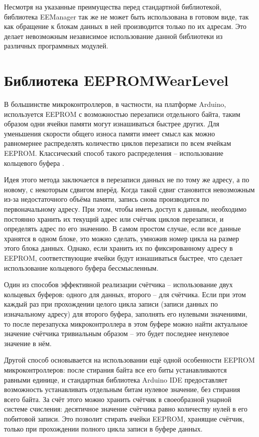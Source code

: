 Несмотря на указанные преимущества перед стандартной библиотекой, библиотека EEManager так же не может быть использована в готовом виде, так как обращение к блокам данных в ней производится только по их адресам.
Это делает невозможным независимое использование данной библиотеки из различных программных модулей.


\section{Библиотека EEPROMWearLevel}

В большинстве микроконтроллеров, в частности, на платформе Arduino, используется EEPROM с возможностью перезаписи отдельного байта, таким образом одни ячейки памяти могут изнашиваться быстрее других.
Для уменьшения скорости общего износа памяти имеет смысл как можно равномернее распределять количество циклов перезаписи по всем ячейкам EEPROM.
Классический способ такого распределения -- использование кольцевого буфера \cite{web:circular-buffer}.

Идея этого метода заключается в перезаписи данных не по тому же адресу, а по новому, с некоторым сдвигом вперёд. Когда такой сдвиг становится невозможным из-за недостаточного объёма памяти, запись снова производится по первоначальному адресу.
При этом, чтобы иметь доступ к данным, необходимо постоянно хранить их текущий адрес или счётчик циклов перезаписи, и определять адрес по его значению.
В самом простом случае, если все данные хранятся в одном блоке, это можно сделать, умножив номер цикла на размер этого блока данных.
Однако, если хранить их по фиксированному адресу в EEPROM, соответствующие ячейки будут изнашиваться быстрее, что сделает использование кольцевого буфера бессмысленным.

Один из способов эффективной реализации счётчика -- использование двух кольцевых буферов: одного для данных, второго -- для счётчика.
Если при этом каждый раз при прохождении целого цикла записи (записи данных по изначальному адресу) для второго буфера, заполнять его нулевыми значениями, то после перезапуска микроконтроллера в этом буфере можно найти актуальное значение счётчика тривиальным образом -- это будет последнее ненулевое значение в нём.

Другой способ основывается на использовании ещё одной особенности EEPROM микроконтроллеров: после стирания байта все его биты устанавливаются равными единице, и стандартная библиотека Arduino IDE предоставляет возможность устанавливать отдельным битам нулевое значение, без стирания всего байта.
За счёт этого можно хранить счётчик в своеобразной унарной системе счисления: десятичное значение счётчика равно количеству нулей в его побитовой записи.
Это позволит стирать ячейки EEPROM, хранящие счётчик, только при прохождении полного цикла записи в буфере данных.

